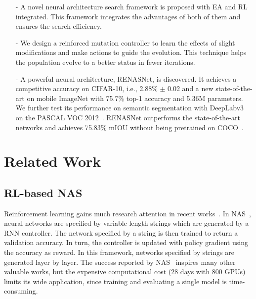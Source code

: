 \documentclass[10pt,twocolumn,letterpaper]{article}
\begin{document}

\begin{enumerate}
\item[-] A novel neural architecture search framework is proposed with EA and RL integrated. This framework integrates the advantages of both of them and ensures the search efficiency.

\item[-] We design a reinforced mutation controller to learn the effects of slight modifications and make actions to guide the evolution. This technique helps the population evolve to a better status in fewer iterations.
\item[-] A powerful neural architecture, RENASNet, is discovered. It achieves a competitive accuracy on CIFAR-10, i.e., 2.88\% $\pm$ 0.02 and a new state-of-the-art on mobile ImageNet with 75.7\% top-1 accuracy and 5.36M parameters. We further test its performance on semantic segmentation with DeepLabv3~\cite{deeplab-v3} on the PASCAL VOC 2012~\cite{PascalVOC}. RENASNet outperforms the state-of-the-art networks and achieves 75.83\% mIOU without being pretrained on COCO~\cite{COCO}.
\end{enumerate}

\section{Related Work}
\subsection{RL-based NAS}
Reinforcement learning gains much research attention in recent works~\cite{zoph2017learning,cai2018efficient,zoph2016neural,baker2016designing}. In NAS~\cite{zoph2016neural}, neural networks are specified by variable-length strings which are generated by a RNN controller. The network specified by a string is then trained to return a validation accuracy. In turn, the controller is updated with policy gradient using the accuracy as reward. In this framework, networks specified by strings are generated layer by layer. The success reported by NAS~\cite{zoph2016neural} inspires many other valuable works, but the expensive computational cost (28 days with 800 GPUs) limits its wide application, since training and evaluating a single model is time-consuming. %
\end{document}
